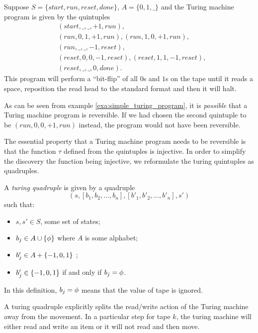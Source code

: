 \begin{example}\label{exa:simple_turing_program}
  Suppose $S=\{start,run,reset,done\}$, $A=\{0,1,\_\}$ and the Turing machine
  program is given by the quintuples
  \begin{align*}
    &(start,\_,\_,+1,run),\\
    &(run,0,1,+1,run), (run,1,0,+1,run),\\
    &(run,\_,\_,-1,reset),\\
    &(reset,0,0,-1,reset),(reset,1,1,-1,reset),\\
    &(reset,\_,\_,0,done).
  \end{align*}
  This program will perform a ``bit-flip'' of all $0$s and $1$s on the tape
  until it reads a space, reposition the read head to the standard format
  and then it will halt.
\end{example}

As can be seen from example \ref{exa:simple_turing_program}, it is \emph{possible}
that a Turing machine program is reversible. If we had chosen the second
quintuple to be $(run,0,0,+1,run)$ instead, the program would not have been
reversible.

The essential property that a Turing machine program needs to be reversible
is that the function $\tau$ defined from the quintuples is injective. In order
to simplify the discovery the function being injective, we reformulate the
turing quintuples as quadruples.

\begin{definition}\label{def:turing_quadruple}
  A \emph{turing quadruple} is given by a quadruple
  \[(s,[b_1,b_2,\ldots,b_n],[b'_1,b'_2,\ldots,b'_n],s')\]
  such that:
  \begin{itemize}
    \item $s,s'\in S$, some set of states;
    \item $b_j\in A  \cup \{\phi\}$ where $A$ is some alphabet;
    \item $b'_j\in A  + \{-1,0,1\}$ ;
    \item $b'_j \in \{-1,0,1\}$ if and only if $b_j = \phi$.
  \end{itemize}
  In this definition, $b_j = \phi$ means that the value of tape
  \jay is ignored.
\end{definition}

A turing quadruple explicitly splits the read/write action of the
Turing machine away from the movement. In a particular step for
tape $k$, the
turing machine will either read and write an item or it will not
read and then move.

